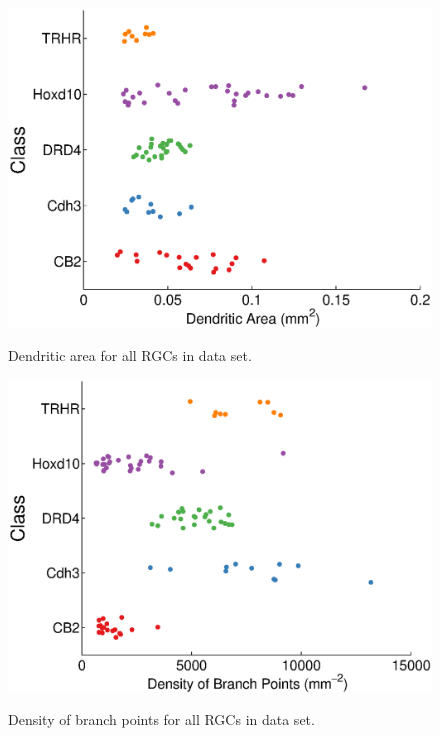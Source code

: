 \documentclass{article}
\begin{document}
\begin{figure}
  \centering
  {\includegraphics[scale=0.75]{Figures/SupFig3/plotFeatures-dendriticField.eps}}
  \caption{Dendritic area for all RGCs in data set.}
\end{figure}


\begin{figure}
  \centering
  {\includegraphics[scale=0.75]{Figures/SupFig3/plotFeatures-densityOfBranchPoints.eps}}
  \caption{Density of branch points for all RGCs in data set.}
\end{figure}

\clearpage
\end{document}
